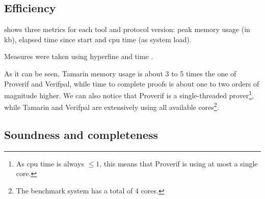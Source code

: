 \begin{table}[!ht]
    \renewcommand{\arraystretch}{1.5}
    \setlength\arrayrulewidth{1pt}
    \caption{Expressiveness of tools.}
    \label{tbl:expressiveness}
\end{table}

\subsection{Efficiency}
 shows three metrics for each tool and protocol version: peak memory usage (in kb), elapsed time since start and cpu time (as system load).

Measures were taken using hyperfine \cite{hyperfine} and time \cite{time}.

As it can be seen, Tamarin memory usage is about 3 to 5 times the one of Proverif and Verifpal, while time to complete proofs is about one to two orders of magnitude higher. We can also notice that Proverif is a single-threaded prover\footnote{As cpu time is always $\leq 1$, this means that Proverif is using at most a single core.}, while Tamarin and Verifpal are extensively using all available cores\footnote{The benchmark system has a total of 4 cores.}.




\newpage
\subsection{Soundness and completeness}

